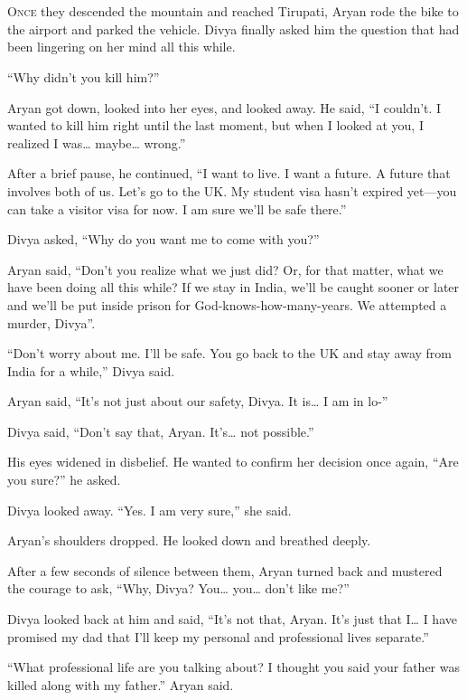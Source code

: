 \chapter{}

\lettrine{O}{nce} they descended the mountain and reached Tirupati, Aryan rode
the bike to the airport and parked the vehicle. Divya finally asked him the
question that had been lingering on her mind all this while.

“Why didn't you kill him?”

Aryan got down, looked into her eyes, and looked away. He said, “I couldn't. I
wanted to kill him right until the last moment, but when I looked at you, I
realized I was… maybe… wrong.”

After a brief pause, he continued, “I want to live. I want a future. A future
that involves both of us. Let's go to the UK. My student visa hasn't expired yet—you
can take a visitor visa for now. I am sure we'll be safe there.”

Divya asked, “Why do you want me to come with you?”

Aryan said, “Don't you realize what we just did? Or, for that matter, what we have
been doing all this while? If we stay in India, we'll be caught sooner or later
and we'll be put inside prison for God-knows-how-many-years. We attempted a
murder, Divya”.

“Don't worry about me. I'll be safe. You go back to the UK and stay away from India
for a while,” Divya said.

Aryan said, “It's not just about our safety, Divya. It is… I am in lo-”

Divya said, “Don't say that, Aryan. It's… not possible.”

His eyes widened in disbelief. He wanted to confirm her decision once again,
“Are you sure?” he asked.

Divya looked away. “Yes. I am very sure,” she said.

Aryan's shoulders dropped. He looked down and breathed deeply.

After a few seconds of silence between them, Aryan turned back and mustered the
courage to ask, “Why, Divya? You… you… don't like me?”

Divya looked back at him and said, “It's not that, Aryan. It's just that I…
I have promised my dad that I'll keep my personal and professional lives
separate.”

“What professional life are you talking about? I thought you said your father
was killed along with my father.” Aryan said.

